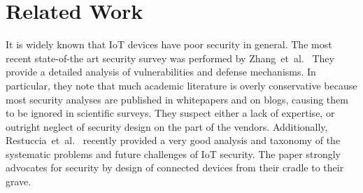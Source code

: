 \section{Related Work} %
\label{sec:related_work}





It is widely known that IoT devices have poor security in general.
The most recent state-of-the art security survey was performed by
Zhang~et~al.~\cite{Zhang:2017:UISTDCBWWNaWWG} %
They provide a detailed analysis of vulnerabilities and defense mechanisms.
In particular, they note that much academic literature is overly conservative because most security analyses are published in whitepapers and on blogs, causing them to be ignored in scientific surveys.
They suspect either a lack of expertise, or outright neglect of security design on the part of the vendors.
Additionally,
Restuccia~et~al.~\cite{Restuccia:2018:SITNPaRC} %
recently provided a very good analysis and taxonomy of the systematic problems and future challenges of IoT security. The paper strongly advocates for security by design of connected devices from their cradle to their grave.

